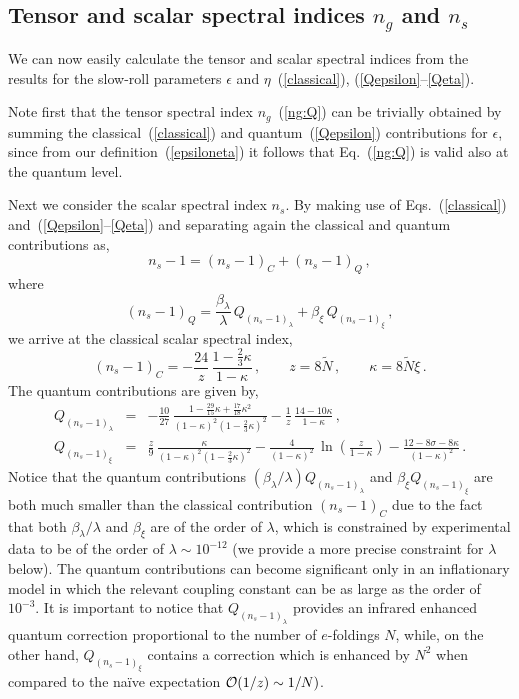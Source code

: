 \subsection{Tensor and scalar spectral indices $n_g$ and $n_s$}
\label{Tensor and scalar spectral indices $n_g$ and $n_s$}

 We can now easily calculate the tensor and scalar spectral indices from
the results for the slow-roll parameters
 $\epsilon$ and $\eta$~(\ref{classical}), (\ref{Qepsilon}--\ref{Qeta}).

 Note first that the tensor spectral index $n_g$~(\ref{ng:Q})
can be trivially obtained by summing the classical~(\ref{classical})
and quantum~(\ref{Qepsilon}) contributions for $\epsilon$, since from our
definition~(\ref{epsiloneta}) it follows that Eq.~(\ref{ng:Q})
is valid also at the quantum level.

 Next we consider the scalar spectral index $n_s$.
By making use of Eqs.~(\ref{classical}) and~(\ref{Qepsilon}--\ref{Qeta}) and
separating again the classical and quantum contributions as,
\begin{equation}
n_s -1 = (n_s-1)_{C} + (n_s-1)_Q
\,,
\label{nsQ}
\end{equation}
where
\begin{equation}
(n_s-1)_Q = \frac{\beta_{\lambda}}{\lambda}\,Q_{(n_s-1)_{\lambda}}
+ \beta_{\xi}\,Q_{(n_s-1)_{\xi}}\,,
\end{equation}
we arrive at the classical scalar spectral index,
\begin{equation}
(n_s-1)_{C} =
-\frac{24}{z}\,\frac{1-\frac23\kappa}{1-\kappa}
\,,\qquad
  z = 8\tilde N\,,\qquad \kappa = 8\tilde N\xi
\,.
\label{nsC}
\end{equation}
The quantum contributions are given by,
\begin{eqnarray}
Q_{(n_s-1)_{\lambda}} &=&
 -\frac{10}{27}\,
\frac{1-\frac{29}{15}\kappa+\frac{17}{18}\kappa^2}{(1-\kappa)^2(1-\frac{2}{3}\kappa)^2}
-\frac{1}{z}\,\frac{14-10\kappa}{1-\kappa}
\,,
\label{nsQ2}
\\
Q_{(n_s-1)_{\xi}} &=&
\frac{z}{9}\,\frac{\kappa}{(1-\kappa)^2(1-\frac{2}{3}\kappa)^2} - \frac{4}{(1-\kappa)^2}\,\ln\left(\frac{z}{1-\kappa}\right) - \frac{12-8\sigma-8\kappa}{(1-\kappa)^2} \,.
\nonumber
\end{eqnarray}
Notice that the quantum contributions
$({\beta_{\lambda}}/{\lambda})Q_{(n_s-1)_{\lambda}}$ and
$\beta_{\xi}Q_{(n_s-1)_{\xi}}$ are both much smaller than the
classical contribution $(n_s-1)_C$ due to the fact that both
${\beta_{\lambda}}/{\lambda}$ and $\beta_{\xi}$ are of the order of
$\lambda$, which is constrained by experimental data to be of the
order of $\lambda \sim 10^{-12}$ (we provide a more precise
constraint for $\lambda$ below). The quantum contributions can
become significant only in an inflationary model in which the
relevant coupling constant can be as large as the order of $10^{-3}$.
It is important to notice that $Q_{(n_s-1)_{\lambda}}$ provides an
infrared enhanced quantum correction proportional to the number of
$e$-foldings $N$, while, on the other hand, $Q_{(n_s-1)_{\xi}}$
contains a correction which is enhanced by $N^2$ when compared to
the na\"ive expectation ${\cal O}(1/z)\sim 1/N)$. 

